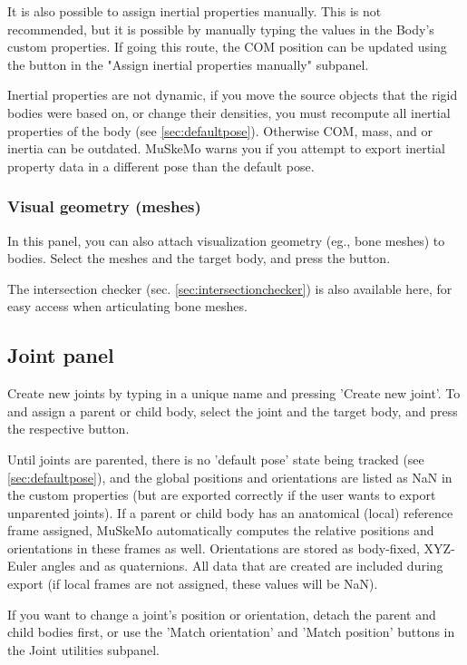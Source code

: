 \documentclass{article}
\begin{document}
It is also possible to assign inertial properties manually. This is not recommended, but it is possible by manually typing the values in the Body's custom properties. If going this route, the COM position can be updated using the button in the "Assign inertial properties manually" subpanel.


Inertial properties are not dynamic, if you move the source objects that the rigid bodies were based on, or change their densities, you must recompute all inertial properties of the body (see \ref{sec:defaultpose}). Otherwise COM, mass, and or inertia can be outdated. MuSkeMo warns you if you attempt to export inertial property data in a different pose than the default pose.

\subsubsection{Visual geometry (meshes)}
\label{sec:visgeomsubpanel}
In this panel, you can also attach visualization geometry (eg., bone meshes) to bodies. Select the meshes and the target body, and press the button.

The intersection checker (sec. \ref{sec:intersectionchecker}) is also available here, for easy access when articulating bone meshes.


\subsection{Joint panel}
\label{sec:jointpanel}

Create new joints by typing in a unique name and pressing 'Create new joint'. To and assign a parent or child body, select the joint and the target body, and press the respective button. 


Until joints are parented, there is no 'default pose' state being tracked (see \ref{sec:defaultpose}), and the global positions and orientations are listed as NaN in the custom properties (but are exported correctly if the user wants to export unparented joints). If a parent or child body has an anatomical (local) reference frame assigned, MuSkeMo automatically computes the relative positions and orientations in these frames as well. Orientations are stored as body-fixed, XYZ-Euler angles and as quaternions. All data that are created are included during export (if local frames are not assigned, these values will be NaN).

If you want to change a joint's position or orientation, detach the parent and child bodies first, or use the 'Match orientation' and 'Match position' buttons in the Joint utilities subpanel.
\end{document}
